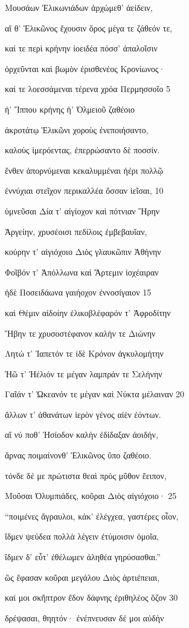 Μουσάων Ἑλικωνιάδων ἀρχώμεθ' ἀείδειν,

αἵ θ' Ἑλικῶνος ἔχουσιν ὄρος μέγα τε ζάθεόν τε, 

καί τε περὶ κρήνην ἰοειδέα πόσσ' ἁπαλοῖσιν

ὀρχεῦνται καὶ βωμὸν ἐρισθενέος Κρονίωνος·

καί τε λοεσσάμεναι τέρενα χρόα Περμησσοῖο \num{5}

ἠ' Ἵππου κρήνης ἠ' Ὀλμειοῦ ζαθέοιο

ἀκροτάτῳ Ἑλικῶνι χοροὺς ἐνεποιήσαντο,

καλοὺς ἱμερόεντας, ἐπερρώσαντο δὲ ποσσίν.

ἔνθεν ἀπορνύμεναι κεκαλυμμέναι ἠέρι πολλῷ 

ἐννύχιαι στεῖχον περικαλλέα ὄσσαν ἱεῖσαι, \num{10}

ὑμνεῦσαι Δία τ' αἰγίοχον καὶ πότνιαν Ἥρην

Ἀργείην, χρυσέοισι πεδίλοις ἐμβεβαυῖαν, 

κούρην τ' αἰγιόχοιο Διὸς γλαυκῶπιν Ἀθήνην

Φοῖβόν τ' Ἀπόλλωνα καὶ Ἄρτεμιν ἰοχέαιραν

ἠδὲ Ποσειδάωνα γαιήοχον ἐννοσίγαιον \num{15} 

καὶ Θέμιν αἰδοίην ἑλικοβλέφαρόν τ' Ἀφροδίτην

Ἥβην τε χρυσοστέφανον καλήν τε Διώνην

Λητώ τ' Ἰαπετόν τε ἰδὲ Κρόνον ἀγκυλομήτην

Ἠῶ τ' Ἠέλιόν τε μέγαν λαμπράν τε Σελήνην

Γαῖάν τ' Ὠκεανόν τε μέγαν καὶ Νύκτα μέλαιναν \num{20}

ἄλλων τ' ἀθανάτων ἱερὸν γένος αἰὲν ἐόντων.

αἵ νύ ποθ' Ἡσίοδον καλὴν ἐδίδαξαν ἀοιδήν,

ἄρνας ποιμαίνονθ' Ἑλικῶνος ὕπο ζαθέοιο.

τόνδε δέ με πρώτιστα θεαὶ πρὸς μῦθον ἔειπον,

Μοῦσαι Ὀλυμπιάδες, κοῦραι Διὸς αἰγιόχοιο· \num{25} 

``ποιμένες ἄγραυλοι, κάκ' ἐλέγχεα, γαστέρες οἶον,

ἴδμεν ψεύδεα πολλὰ λέγειν ἐτύμοισιν ὁμοῖα,

ἴδμεν δ' εὖτ' ἐθέλωμεν ἀληθέα γηρύσασθαι.''

ὣς ἔφασαν κοῦραι μεγάλου Διὸς ἀρτιέπειαι,

καί μοι σκῆπτρον ἔδον δάφνης ἐριθηλέος ὄζον \num{30}

δρέψασαι, θηητόν· ἐνέπνευσαν δέ μοι αὐδὴν 


